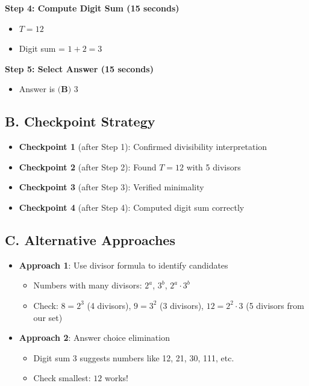 \documentclass[]{article}
\begin{document}
\begin{roadmapbox}
\textbf{Step 4: Compute Digit Sum (15 seconds)}
\begin{itemize}[leftmargin=*]
    \item $T = 12$
    \item Digit sum = $1 + 2 = 3$
\end{itemize}

\textbf{Step 5: Select Answer (15 seconds)}
\begin{itemize}[leftmargin=*]
    \item Answer is $\boxed{\textbf{(B) } 3}$
\end{itemize}

\subsection*{B. Checkpoint Strategy}
\begin{itemize}[leftmargin=*]
    \item \textbf{Checkpoint 1} (after Step 1): Confirmed divisibility interpretation
    \item \textbf{Checkpoint 2} (after Step 2): Found $T = 12$ with 5 divisors
    \item \textbf{Checkpoint 3} (after Step 3): Verified minimality
    \item \textbf{Checkpoint 4} (after Step 4): Computed digit sum correctly
\end{itemize}

\subsection*{C. Alternative Approaches}
\begin{itemize}[leftmargin=*]
    \item \textbf{Approach 1}: Use divisor formula to identify candidates
    \begin{itemize}
        \item Numbers with many divisors: $2^a$, $3^b$, $2^a \cdot 3^b$
        \item Check: $8 = 2^3$ (4 divisors), $9 = 3^2$ (3 divisors), $12 = 2^2 \cdot 3$ (5 divisors from our set)
    \end{itemize}
    \item \textbf{Approach 2}: Answer choice elimination
    \begin{itemize}
        \item Digit sum 3 suggests numbers like 12, 21, 30, 111, etc.
        \item Check smallest: $12$ works!
    \end{itemize}
\end{itemize}


\end{roadmapbox}
\end{document}
